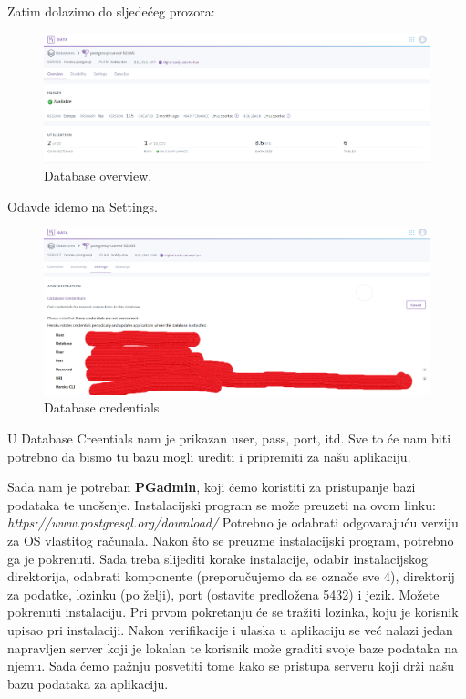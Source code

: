 		 Zatim dolazimo do sljedećeg prozora:
			 
			 \begin{figure}[H]
			 	\includegraphics[scale=0.4]{slike/Datastores.png} 
			 	\centering
			 	\caption{ Database overview.}
			 	\label{DO}
			 \end{figure}
		 
		 	Odavde idemo na Settings.
		 	
		 	
		 	\begin{figure}[H]
		 		\includegraphics[scale=0.3]{slike/Datacredentials.png} 
		 		\centering
		 		\caption{ Database credentials.}
		 		\label{DBC}
		 	\end{figure}
			 
			 U Database Creentials nam je prikazan user, pass, port, itd. Sve to će nam biti potrebno da bismo tu bazu mogli urediti i pripremiti za našu aplikaciju.
			 
			 Sada nam je potreban \textbf{PGadmin}, koji ćemo koristiti za pristupanje bazi podataka te unošenje. Instalacijski program se može preuzeti na ovom linku: \textit{https://www.postgresql.org/download/} Potrebno je odabrati odgovarajuću verziju za OS vlastitog računala. Nakon što se preuzme instalacijski program, potrebno ga je pokrenuti. Sada treba slijediti korake instalacije, odabir instalacijskog direktorija, odabrati komponente (preporučujemo da se označe sve 4), direktorij za podatke, lozinku (po želji), port (ostavite predložena 5432) i jezik. Možete pokrenuti instalaciju. Pri prvom pokretanju će se tražiti lozinka, koju je korisnik upisao pri instalaciji. Nakon verifikacije i ulaska u aplikaciju se već nalazi jedan napravljen server koji je lokalan te korisnik može graditi svoje baze podataka na njemu. Sada ćemo pažnju posvetiti tome kako se pristupa serveru koji drži našu bazu podataka za aplikaciju.
			 
